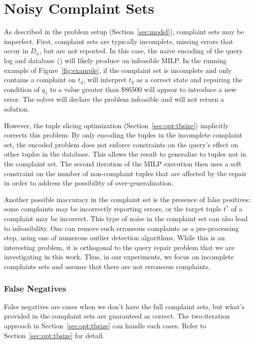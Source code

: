 
\section{Noisy Complaint Sets}
\label{sec:noise}

As described in the problem setup (Section~\ref{sec:model}), complaint
sets may be imperfect. First, complaint sets are typically incomplete,
missing errors that occur in $D_n$, but are not reported. In this
case, the naive encoding of the query log and database (\naive) will
likely produce an infeasible MILP. In the running example of
Figure~\ref{fig:example}, if the complaint set is incomplete and only
contains a complaint on $t_4$, \naive will interpret $t_3$ as a
correct state and repairing the condition of $q_1$ to a value greater
than $\$86500$ will appear to introduce a new error. The solver will
declare the problem infeasible and will not return a solution.



However, the tuple slicing optimization (Section~\ref{sec:opt:tbsize})
implicitly corrects this problem: By only encoding the tuples in the
incomplete complaint set, the encoded problem does not enforce
constraints on the query's effect on other tuples in the database.
This allows the result to generalize to tuples not in the complaint
set. The second iteration of the MILP execution then uses a soft
constraint on the number of non-complaint tuples that are affected by
the repair in order to address the possibility of over-generalization.

Another possible inaccuracy in the complaint set is the presence of
false positives: some complaints may be incorrectly reporting errors,
or the target tuple $t^*$ of a complaint may be incorrect. This type
of noise in the complaint set can also lead to infeasibility. One can
remove such erroneous complaints as a pre-processing step, using one
of numerous outlier detection algorithms. While this is an
interesting problem, it is orthogonal to the query repair problem that
we are investigating in this work. Thus, in our experiments, we focus
on incomplete complaints sets and assume that there are not erroneous
complaints.


  \subsubsection{False Negatives}
  False negatives are cases when we don't have the full complaint sets, but
  what's provided in the complaint sets are guaranteed as correct. The 
  two-iteration approach in Section~\ref{sec:opt:tbsize} can handle 
  such cases. Refer to Section~\ref{sec:opt:tbsize} for detail.



